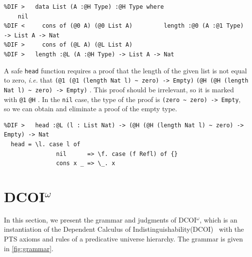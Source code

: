 \documentclass[acmsmall, screen=true, nonacm=true,
  review=\ifpublic false\else true\fi,
  anonymous=\ifanonymous true\else false\fi
]{acmart}
\makeatletter
\newcommand{\dcoi}{DCOI\@\xspace}
\newcommand{\name}{\texorpdfstring{DCOI$^{\omega}$\@\xspace}{DCOI-omega}}
\newcommand{\longname}{Dependent Calculus of Indistinguishability\@\xspace}
\providecommand{\DIFaddbegin}{} %
\providecommand{\DIFaddend}{} %
\providecommand{\DIFdelbegin}{} %
\providecommand{\DIFdelend}{} %
\providecommand{\DIFmodbegin}{} %
\providecommand{\DIFmodend}{} %
\makeatother
\begin{document}
\DIFmodbegin
\begin{lstlisting}[alsolanguage=DIFcode]
%DIF <   data List (A :@1 Type) :@1 Type where
%DIF >   data List (A :@H Type) :@H Type where
    nil
%DIF <     cons of (@0 A) (@0 List A)         length :@0 (A :@1 Type) -> List A -> Nat
%DIF >     cons of (@L A) (@L List A)
%DIF >   length :@L (A :@H Type) -> List A -> Nat
\end{lstlisting}
\DIFmodend

A safe \lstinline{head} function requires a proof
that the length of the given list is not equal to zero, \emph{i.e.} that
\DIFdelbegin %
{\color{red}%
\lstinline{(@1 (@1 (length Nat l) ~ zero) -> Empty)}%
}%
\DIFdelend \DIFaddbegin {\color{blue}%
\lstinline{(@H (@H (length Nat l) ~ zero) -> Empty)}%
}%
\DIFaddend . This proof
should be irrelevant, so it is marked with \DIFdelbegin %
{\color{red}%
\lstinline{@1}%
}%
\DIFdelend \DIFaddbegin {\color{blue}%
\lstinline{@H}%
}%
\DIFaddend .
In the \lstinline{nil} case, the type of the proof is
\lstinline{(zero ~ zero) -> Empty},
so we can obtain and eliminate a proof of the empty type.

\DIFmodbegin
\begin{lstlisting}[alsolanguage=DIFcode]
%DIF <   head :@0 (l : List Nat) -> (@1 (@1 (length Nat l) ~ zero) -> Empty) -> Nat
%DIF >   head :@L (l : List Nat) -> (@H (@H (length Nat l) ~ zero) -> Empty) -> Nat
  head = \l. case l of
               nil      => \f. case (f Refl) of {}
               cons x _ => \_. x
\end{lstlisting}
\DIFmodend

\section{\name}

In this section, we present the grammar and judgments of \name,
which is an instantiation of the \longname (\dcoi)~\citep{liu:dcoi} with
the PTS axioms and rules of a predicative universe hierarchy.
The grammar is given in \cref{fig:grammar}.
\end{document}
